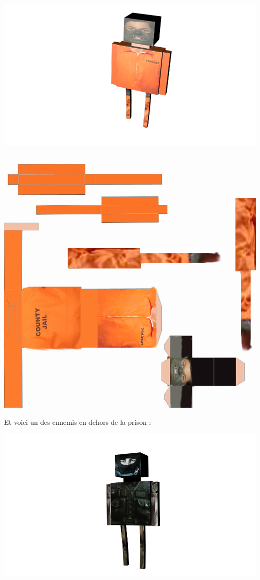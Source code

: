 \documentclass{article}
\begin{document}
\begin{center}
\includegraphics[scale=0.8]{prisonnierblend.png}
\end{center}
\begin{center}
\includegraphics[scale=0.2]{prisonnier.png}
\end{center}
\newpage
Et voici un des ennemis en dehors de la prison : 
\begin{center}
\includegraphics[scale=0.8]{ennemidehorsblend.png}
\end{center}
\end{document}
